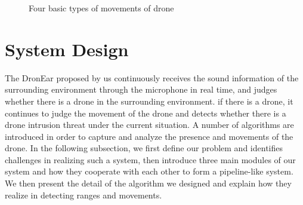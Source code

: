 \documentclass{sig-alternate-10pt}
\begin{document}
\begin{figure}[!h]
	\centering
	\caption{Four basic types of movements of drone}
	\label{movements}
\end{figure}

\section{System Design}

The DronEar proposed by us continuously receives the sound information of the surrounding environment through the microphone in real time, and judges whether there is a drone in the surrounding environment. if there is a drone, it continues to judge the movement of the drone and detects whether there is a drone intrusion threat under the current situation.
A number of algorithms are introduced in order to capture and analyze the presence and movements of the drone.
In the following subsection, we first define our problem and identifies challenges in realizing such a system, then introduce three main modules of our system and how they cooperate with each other to form a pipeline-like system. We then present the detail of the algorithm we designed and explain how they realize in detecting ranges and movements.
\end{document}
